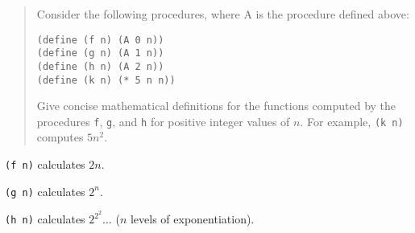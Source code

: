 \documentclass{article}
\begin{document}
\begin{quote}
    Consider the following procedures, where A is the procedure defined above:

    \begin{lstlisting}
(define (f n) (A 0 n))
(define (g n) (A 1 n))
(define (h n) (A 2 n))
(define (k n) (* 5 n n))
    \end{lstlisting}

    Give concise mathematical definitions for the functions computed by the
    procedures \verb|f|, \verb|g|, and \verb|h| for positive integer values of
    $n $. For example, \verb|(k n)| computes $5n^2$.
\end{quote}

\verb|(f n)| calculates $2n$.

\verb|(g n)| calculates $2^n$.

\verb|(h n)| calculates $2^{2^2}\ldots$ ($n$ levels of exponentiation).
\end{document}
